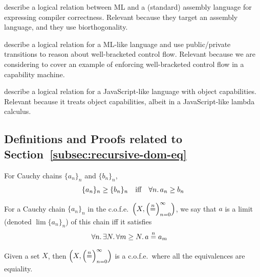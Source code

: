 \documentclass{article}
\newcommand{\nequal}[1][n]{\stackrel{\tiny{#1}}{=}}
\newcommand{\cofe}{c.o.f.e.}
\begin{document}
\cite{Hur:2011:KLR:1926385.1926402} describe a logical relation between ML and
a (standard) assembly language for expressing compiler correctness.  Relevant
because they target an assembly language, and they use biorthogonality.

\cite{Dreyer:2010:IHS:1863543.1863566} describe a logical relation for a ML-like
language and use public/private transitions to reason about well-bracketed
control flow. Relevant because we are considering to cover an example of
enforcing well-bracketed control flow in a capability machine.

\cite{Devriese:2016ObjCap} describe a logical relation for a JavaScript-like
language with object capabilities.  Relevant because it treats object
capabilities, albeit in a JavaScript-like lambda calculus.




\begin{appendices}
\section{Definitions and Proofs related to Section~\ref{subsec:recursive-dom-eq}}
\end{appendices}

\begin{definition}
  For Cauchy chains $\{a_n\}_n$ and $\{b_n\}_n$,
  \begin{align*}
    \{a_n\}_n \geq \{b_n\}_n & & \text{iff} & & \forall n \ldotp a_n \geq b_n
  \end{align*}
\end{definition}

\begin{definition}
  For a Cauchy chain $\{a_n\}_n$ in the \cofe{}\ $\left(X, \left(\nequal\right)_{n=0}^{\infty} \right)$, we say that $a$ is a limit  (denoted $\lim\{a_n\}_n$) of this chain iff it satisfies
  \begin{align*}
    & \forall n \ldotp \exists N \ldotp \forall m \geq N \ldotp a \nequal a_m
  \end{align*}
\end{definition}

\begin{definition}[Set \cofe{}\ Construction]
  Given a set $X$, then $\left(X, \left(\nequal\right)_{n=0}^{\infty} \right)$ is a \cofe{}\ where all the equivalences are equiality.
\end{definition}
\end{document}
